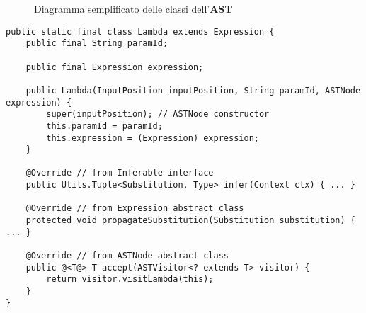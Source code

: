 \begin{figure}
    \caption{Diagramma semplificato delle classi dell'\textbf{AST}}
    \label{fig:5-ast-classes}
    \vspace{4mm}
\end{figure}

\begin{lstlisting}[caption={Esempio di classe della gerarchia}, style=javaCode, label={lst:5-class-example-java}]
public static final class Lambda extends Expression {
    public final String paramId;

    public final Expression expression;

    public Lambda(InputPosition inputPosition, String paramId, ASTNode expression) {
        super(inputPosition); // ASTNode constructor
        this.paramId = paramId;
        this.expression = (Expression) expression;
    }

    @Override // from Inferable interface
    public Utils.Tuple<Substitution, Type> infer(Context ctx) { ... }

    @Override // from Expression abstract class
    protected void propagateSubstitution(Substitution substitution) { ... }

    @Override // from ASTNode abstract class
    public @<T@> T accept(ASTVisitor<? extends T> visitor) {
        return visitor.visitLambda(this);
    }
}
\end{lstlisting}

